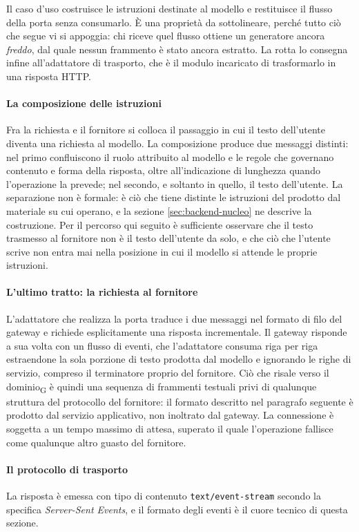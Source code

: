 \documentclass[a4paper, 10pt]{article}
\begin{document}
Il caso d'uso costruisce le istruzioni destinate al modello e restituisce il flusso della porta senza consumarlo. È una proprietà da sottolineare, perché tutto ciò che segue vi si appoggia: chi riceve quel flusso ottiene un generatore ancora \textit{freddo}, dal quale nessun frammento è stato ancora estratto. La rotta lo consegna infine all'adattatore di trasporto, che è il modulo incaricato di trasformarlo in una risposta HTTP.

\paragraph{La composizione delle istruzioni}
Fra la richiesta e il fornitore si colloca il passaggio in cui il testo dell'utente diventa una richiesta al modello. La composizione produce due messaggi distinti: nel primo confluiscono il ruolo attribuito al modello e le regole che governano contenuto e forma della risposta, oltre all'indicazione di lunghezza quando l'operazione la prevede; nel secondo, e soltanto in quello, il testo dell'utente. La separazione non è formale: è ciò che tiene distinte le istruzioni del prodotto dal materiale su cui operano, e la sezione \ref{sec:backend-nucleo} ne descrive la costruzione. Per il percorso qui seguito è sufficiente osservare che il testo trasmesso al fornitore non è il testo dell'utente da solo, e che ciò che l'utente scrive non entra mai nella posizione in cui il modello si attende le proprie istruzioni.

\paragraph{L'ultimo tratto: la richiesta al fornitore}
L'adattatore che realizza la porta traduce i due messaggi nel formato di filo del gateway e richiede esplicitamente una risposta incrementale. Il gateway risponde a sua volta con un flusso di eventi, che l'adattatore consuma riga per riga estraendone la sola porzione di testo prodotta dal modello e ignorando le righe di servizio, compreso il terminatore proprio del fornitore. Ciò che risale verso il dominio\textsubscript{G} è quindi una sequenza di frammenti testuali privi di qualunque struttura del protocollo del fornitore: il formato descritto nel paragrafo seguente è prodotto dal servizio applicativo, non inoltrato dal gateway. La connessione è soggetta a un tempo massimo di attesa, superato il quale l'operazione fallisce come qualunque altro guasto del fornitore.

\paragraph{Il protocollo di trasporto}
La risposta è emessa con tipo di contenuto \texttt{text/event-stream} secondo la specifica \textit{Server-Sent Events}, e il formato degli eventi è il cuore tecnico di questa sezione.
\end{document}
